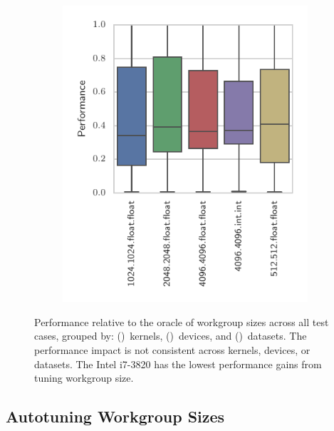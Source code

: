 \documentclass[nonatbib,preprint,nocopyrightspace,9pt]{sigplanconf}
\begin{document}
\begin{figure}
\begin{subfigure}[h]{.48\columnwidth}
      \includegraphics[width=\columnwidth]{img/performance_datasets.pdf}
      \vspace{-1.5em} %
      \caption{}
      \label{fig:performance-datasets}
    \end{subfigure}
    \caption{%
    Performance relative to the oracle of workgroup sizes across all test cases,
    grouped by: ()~kernels, ()~devices, and ()~datasets. The performance impact is not consistent across
    kernels, devices, or datasets. The Intel i7-3820 has the lowest performance
    gains from tuning workgroup size.%
    \vspace{-2em}
    }
    \label{fig:performances}
  \end{figure}

  \subsection{Autotuning Workgroup Sizes}
\end{document}
